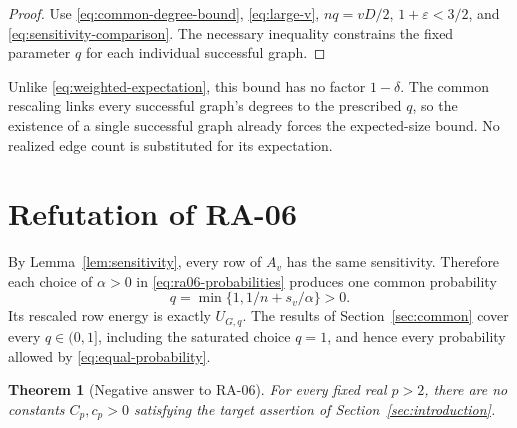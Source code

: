 \documentclass[11pt]{article}
\theoremstyle{spaced}
\newtheorem{theorem}{Theorem}[section]
\numberwithin{equation}{section}
\begin{document}
\begin{proof}
Use \eqref{eq:common-degree-bound}, \eqref{eq:large-v},
$nq=vD/2$, $1+\varepsilon<3/2$, and
\eqref{eq:sensitivity-comparison}. The necessary inequality constrains
the fixed parameter $q$ for each individual successful graph.
\end{proof}

Unlike \eqref{eq:weighted-expectation}, this bound has no factor
$1-\delta$. The common rescaling links every successful graph's degrees
to the prescribed $q$, so the existence of a single successful graph
already forces the expected-size bound. No realized edge count is
substituted for its expectation.

\section{Refutation of RA-06}\label{sec:refutation}

By Lemma~\ref{lem:sensitivity}, every row of $A_v$ has the same
sensitivity. Therefore each choice of $\alpha>0$ in
\eqref{eq:ra06-probabilities} produces one common probability
\begin{equation}\label{eq:equal-probability}
 q=\min\{1,1/n+s_v/\alpha\}>0.
\end{equation}
Its rescaled row energy is exactly $U_{G,q}$. The results of
Section~\ref{sec:common} cover every $q\in(0,1]$, including the
saturated choice $q=1$, and hence every probability allowed by
\eqref{eq:equal-probability}.

\begin{theorem}[Negative answer to RA-06]\label{thm:ra06}
For every fixed real $p>2$, there are no constants $C_p,c_p>0$
satisfying the target assertion of Section~\ref{sec:introduction}.
\end{theorem}
\end{document}
